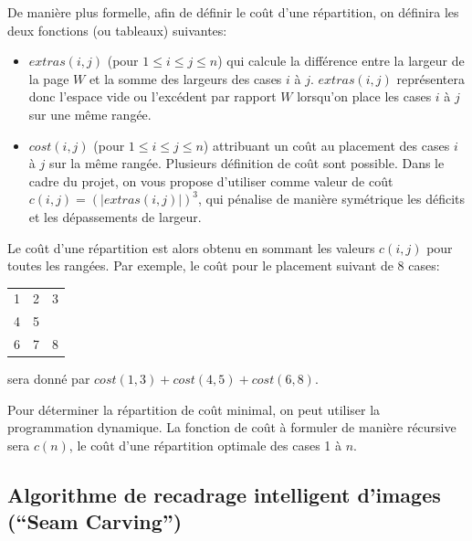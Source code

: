\documentclass[a4paper,10pt]{article}
\begin{document}
De manière plus formelle, afin de définir le coût d'une répartition,
on définira les deux fonctions (ou tableaux) suivantes:
\begin{itemize}
\item $extras(i,j)$ (pour $1\leq i\leq j\leq n$) qui calcule la
  différence entre la largeur de la page $W$ et la somme des largeurs
  des cases $i$ à $j$. $extras(i,j)$ représentera donc l'espace vide
  ou l'excédent par rapport $W$ lorsqu'on place les cases $i$ à $j$
  sur une même rangée.
\item $cost(i,j)$ (pour $1\leq i\leq j\leq n$) attribuant un coût au
  placement des cases $i$ à $j$ sur la même rangée. Plusieurs
  définition de coût sont possible. Dans le cadre du projet, on vous
  propose d'utiliser comme valeur de coût $c(i,j)=(|extras(i,j)|)^3$,
  qui pénalise de manière symétrique les déficits et les dépassements
  de largeur.
\end{itemize}
Le coût d'une répartition est alors obtenu en sommant les valeurs
$c(i,j)$ pour toutes les rangées. Par exemple, le coût pour le
placement suivant de 8 cases:
\begin{center}\begin{tabular}{lll}
1 & 2 & 3\\
4 & 5 & \\
6 & 7 & 8\\
\end{tabular}
\end{center}
sera donné par $cost(1,3)+cost(4,5)+cost(6,8)$.

Pour déterminer la répartition de coût minimal, on peut utiliser la
programmation dynamique.  La fonction de coût à formuler de manière
récursive sera $c(n)$, le coût d'une répartition optimale des cases 1
à $n$.


\subsection{Algorithme de recadrage intelligent d'images (``Seam Carving'')}
\end{document}
